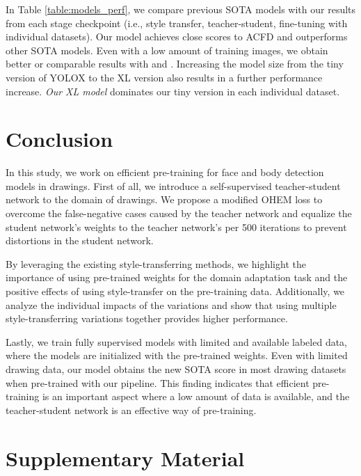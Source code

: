 \documentclass{article}
\newcommand{\ifshowsupplementary}{\iftrue}
\begin{document}
In Table \ref{table:models_perf}, we compare previous SOTA models with our results from each stage checkpoint (i.e., style transfer, teacher-student, fine-tuning with individual datasets). Our model achieves close scores to ACFD \cite{zhang2020acfd} and outperforms other SOTA models. Even with a low amount of training images, we obtain better or comparable results with \cite{jimaging4070089} and \cite{ogawa2018object}. Increasing the model size from the tiny version of YOLOX to the XL version also results in a further performance increase. \textit{Our XL model} dominates our tiny version in each individual dataset. 


\section{Conclusion}

In this study, we work on efficient pre-training for face and body detection models in drawings. First of all, we introduce a self-supervised teacher-student network to the domain of drawings. We propose a modified OHEM loss to overcome the false-negative cases caused by the teacher network and equalize the student network's weights to the teacher network's per 500 iterations to prevent distortions in the student network. 

By leveraging the existing style-transferring methods, we highlight the importance of using pre-trained weights for the domain adaptation task and the positive effects of using style-transfer on the pre-training data. Additionally, we analyze the individual impacts of the variations and show that using multiple style-transferring variations together provides higher performance.

Lastly, we train fully supervised models with limited and available labeled data, where the models are initialized with the pre-trained weights. Even with limited drawing data, our model obtains the new SOTA score in most drawing datasets when pre-trained with our pipeline. This finding indicates that efficient pre-training is an important aspect where a low amount of data is available, and the teacher-student network is an effective way of pre-training. 




\ifshowsupplementary

\newpage
\section{Supplementary Material}
\end{document}
